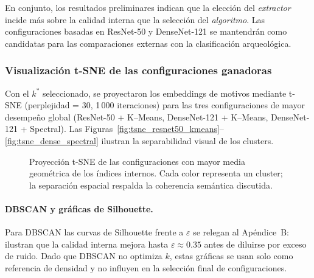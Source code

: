 En conjunto, los resultados preliminares indican que la elección del \emph{extractor} incide más sobre la calidad interna que la selección del \emph{algoritmo}.
Las configuraciones basadas en ResNet-50 y DenseNet-121 se mantendrán como candidatas para las comparaciones externas con la clasificación arqueológica.

\subsubsection{Visualización t-SNE de las configuraciones ganadoras}

Con el $k^\ast$ seleccionado, se proyectaron los embeddings de motivos
mediante t-SNE (perplejidad = 30, 1\,000 iteraciones) para las tres
configuraciones de mayor desempeño global
(ResNet-50 + K–Means, DenseNet-121 + K–Means, DenseNet-121 + Spectral).
Las Figuras~\ref{fig:tsne_resnet50_kmeans}–\ref{fig:tsne_dense_spectral}
ilustran la separabilidad visual de los clusters.

\begin{figure}[!h]
  \centering
  \hfill
  \hfill

  \caption{Proyección t-SNE de las configuraciones con mayor media
    geométrica de los índices internos. Cada color representa un cluster;
    la separación espacial respalda la coherencia semántica discutida.}%
  \label{fig:tsne_best}
\end{figure}

\vspace{1ex}
\paragraph{DBSCAN y gráficas de Silhouette.}
Para DBSCAN las curvas de Silhouette frente a \(\varepsilon\) se relegan al
Apéndice~B: ilustran que la calidad interna mejora hasta
\(\varepsilon\approx0.35\) antes de diluirse por exceso de ruido.
Dado que DBSCAN no optimiza $k$, estas gráficas se usan solo como referencia
de densidad y no influyen en la selección final de configuraciones.

